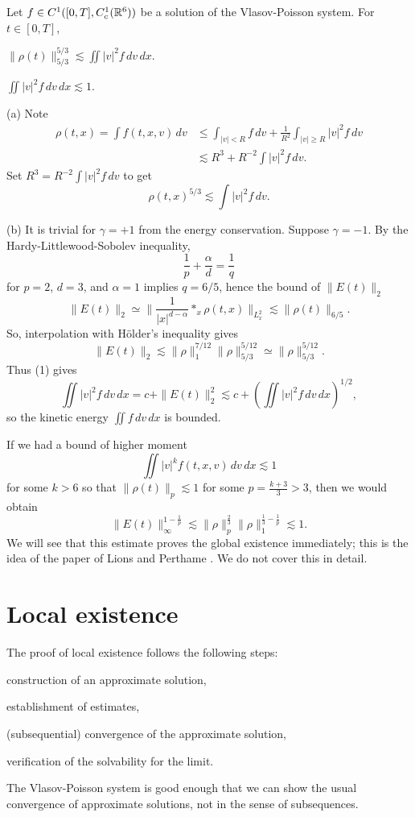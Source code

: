 \documentclass[12pt]{article}
\begin{document}
\begin{lem}
Let $f\in C^1([0,T],C_c^1(\mathbb{R}^6))$ be a solution of the Vlasov-Poisson system.
For $t\in[0,T]$,
\begin{parts}
\item $\|\rho(t)\|_{5/3}^{5/3}\lesssim\iint|v|^2f\,dv\,dx$.
\item $\iint|v|^2f\,dv\,dx\lesssim1$.
\end{parts}
\end{lem}
\begin{pf}
(a)
Note
\begin{align*}
\rho(t,x)=\int f(t,x,v)\,dv
&\le\int_{|v|<R}f\,dv+\frac1{R^2}\int_{|v|\ge R}|v|^2f\,dv\\
&\lesssim R^3+ R^{-2}\int|v|^2f\,dv.
\end{align*}
Set $R^3=R^{-2}\int|v|^2f\,dv$ to get
\[\rho(t,x)^{5/3}\lesssim\int|v|^2f\,dv.\]

(b)
It is trivial for $\gamma=+1$ from the energy conservation.
Suppose $\gamma=-1$.
By the Hardy-Littlewood-Sobolev inequality,
\[\frac1p+\frac\alpha d=\frac1q\]
for $p=2$, $d=3$, and $\alpha=1$ implies $q=6/5$, hence the bound of $\|E(t)\|_2$
\[\|E(t)\|_2\simeq\|\frac1{|x|^{d-\alpha}}*_x\rho(t,x)\|_{L_x^2}\lesssim\|\rho(t)\|_{6/5}.\]
So, interpolation with H\"older's inequality gives
\[\|E(t)\|_2\lesssim\|\rho\|_1^{7/12}\|\rho\|_{5/3}^{5/12}\simeq\|\rho\|_{5/3}^{5/12}.\]
Thus (1) gives
\[\iint|v|^2f\,dv\,dx=c+\|E(t)\|_2^2\lesssim c+(\iint|v|^2f\,dv\,dx)^{1/2},\]
so the kinetic energy $\iint f\,dv\,dx$ is bounded.\qedhere
\end{pf}

\begin{rmk}
If we had a bound of higher moment
\[\iint|v|^kf(t,x,v)\,dv\,dx\lesssim1\]
for some $k>6$ so that $\|\rho(t)\|_p\lesssim1$ for some $p=\frac{k+3}3>3$, then we would obtain
\[\|E(t)\|_\infty^{1-\frac1p}\lesssim\|\rho\|_p^{\frac23}\|\rho\|_1^{\frac13-\frac1p}\lesssim1.\]
We will see that this estimate proves the global existence immediately; this is the idea of the paper of Lions and Perthame \cite{lions1991propagation}.
We do not cover this in detail.
\end{rmk}




\section{Local existence}

The proof of local existence follows the following steps:
\begin{parts}
\item construction of an approximate solution,
\item establishment of estimates,
\item (subsequential) convergence of the approximate solution,
\item verification of the solvability for the limit.
\end{parts}
The Vlasov-Poisson system is good enough that we can show the usual convergence of approximate solutions, not in the sense of subsequences.
\end{document}
